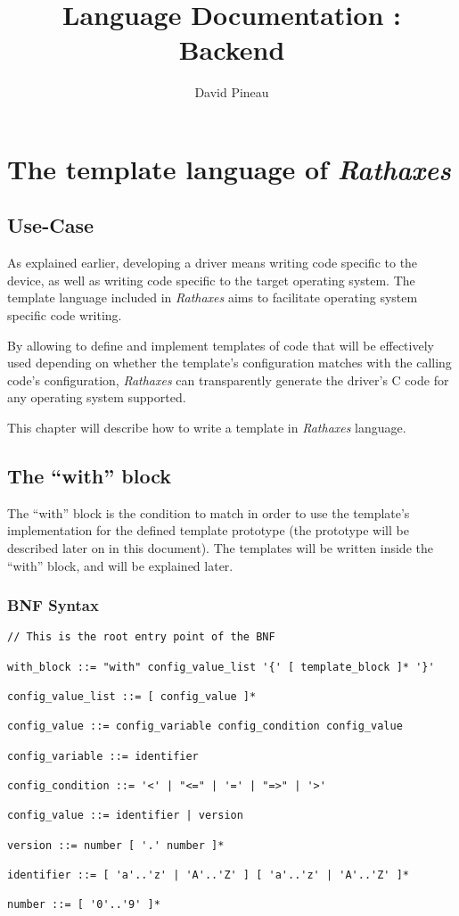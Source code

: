 \documentclass[american]{rtxreport}
\author{David Pineau}
\title{Language Documentation : Backend}
\begin{document}
\maketitle

\rtxmaketitleblock

\tableofcontents

\abstract{}

\chapter{The template language of \emph{Rathaxes}}


\section{Use-Case}

As explained earlier, developing a driver means writing code specific to the
device, as well as writing code specific to the target operating system. The
template language included in \emph{Rathaxes} aims to facilitate operating
system specific code writing.

By allowing to define and implement templates of code that will be effectively
used depending on whether the template's configuration matches with the calling
code's configuration, \emph{Rathaxes} can transparently generate the driver's C
code for any operating system supported.

This chapter will describe how to write a template in \emph{Rathaxes} language.


\section{The “with” block}

The “with” block is the condition to match in order to use the template's
implementation for the defined template prototype (the prototype will be
described later on in this document). The templates will be written inside the
“with” block, and will be explained later.

\subsection{BNF Syntax}

\lstset{}
\begin{lstlisting}
// This is the root entry point of the BNF

with_block ::= "with" config_value_list '{' [ template_block ]* '}'

config_value_list ::= [ config_value ]*

config_value ::= config_variable config_condition config_value

config_variable ::= identifier

config_condition ::= '<' | "<=" | '=' | "=>" | '>'

config_value ::= identifier | version

version ::= number [ '.' number ]*

identifier ::= [ 'a'..'z' | 'A'..'Z' ] [ 'a'..'z' | 'A'..'Z' ]*

number ::= [ '0'..'9' ]*

\end{lstlisting}
\end{document}
